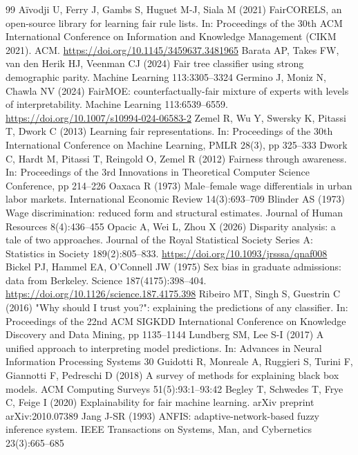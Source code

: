 \documentclass[pdflatex,sn-basic,Numbered,lineno]{sn-jnl}
\begin{document}
\begin{thebibliography}{99}
 Aïvodji U, Ferry J, Gambs S, Huguet M-J, Siala M (2021) FairCORELS, an open-source library for learning fair rule lists. In: Proceedings of the 30th ACM International Conference on Information and Knowledge Management (CIKM 2021). ACM. \url{https://doi.org/10.1145/3459637.3481965}
 Barata AP, Takes FW, van den Herik HJ, Veenman CJ (2024) Fair tree classifier using strong demographic parity. Machine Learning 113:3305–3324
 Germino J, Moniz N, Chawla NV (2024) FairMOE: counterfactually-fair mixture of experts with levels of interpretability. Machine Learning 113:6539–6559. \url{https://doi.org/10.1007/s10994-024-06583-2}
 Zemel R, Wu Y, Swersky K, Pitassi T, Dwork C (2013) Learning fair representations. In: Proceedings of the 30th International Conference on Machine Learning, PMLR 28(3), pp 325–333
 Dwork C, Hardt M, Pitassi T, Reingold O, Zemel R (2012) Fairness through awareness. In: Proceedings of the 3rd Innovations in Theoretical Computer Science Conference, pp 214–226
 Oaxaca R (1973) Male–female wage differentials in urban labor markets. International Economic Review 14(3):693–709
 Blinder AS (1973) Wage discrimination: reduced form and structural estimates. Journal of Human Resources 8(4):436–455
 Opacic A, Wei L, Zhou X (2026) Disparity analysis: a tale of two approaches. Journal of the Royal Statistical Society Series A: Statistics in Society 189(2):805–833. \url{https://doi.org/10.1093/jrsssa/qnaf008}
 Bickel PJ, Hammel EA, O'Connell JW (1975) Sex bias in graduate admissions: data from Berkeley. Science 187(4175):398–404. \url{https://doi.org/10.1126/science.187.4175.398}
 Ribeiro MT, Singh S, Guestrin C (2016) "Why should I trust you?": explaining the predictions of any classifier. In: Proceedings of the 22nd ACM SIGKDD International Conference on Knowledge Discovery and Data Mining, pp 1135–1144
 Lundberg SM, Lee S-I (2017) A unified approach to interpreting model predictions. In: Advances in Neural Information Processing Systems 30
 Guidotti R, Monreale A, Ruggieri S, Turini F, Giannotti F, Pedreschi D (2018) A survey of methods for explaining black box models. ACM Computing Surveys 51(5):93:1–93:42
 Begley T, Schwedes T, Frye C, Feige I (2020) Explainability for fair machine learning. arXiv preprint arXiv:2010.07389
 Jang J-SR (1993) ANFIS: adaptive-network-based fuzzy inference system. IEEE Transactions on Systems, Man, and Cybernetics 23(3):665–685

\end{thebibliography}
\end{document}
